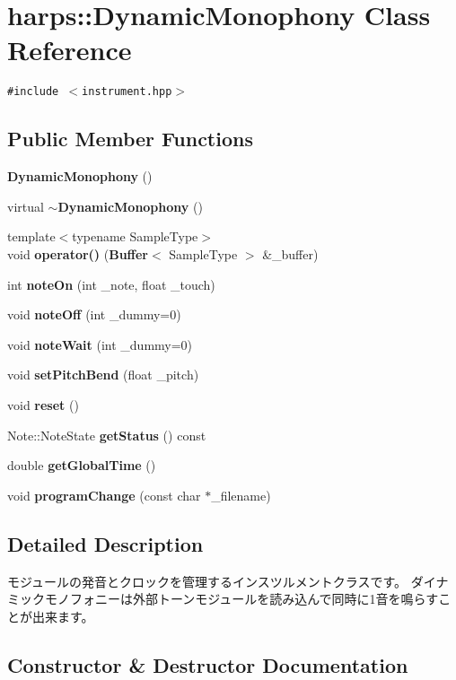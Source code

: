 \section{harps::DynamicMonophony Class Reference}
\label{classharps_1_1DynamicMonophony}
{\tt \#include $<$instrument.hpp$>$}

\subsection*{Public Member Functions}
\begin{CompactItemize}
\item 
{\bf DynamicMonophony} ()
\item 
virtual {\bf $\sim$DynamicMonophony} ()
\item 
{\footnotesize template$<$typename SampleType$>$ }\\void {\bf operator()} ({\bf Buffer}$<$ SampleType $>$ \&\_\-buffer)
\item 
int {\bf noteOn} (int \_\-note, float \_\-touch)
\item 
void {\bf noteOff} (int \_\-dummy=0)
\item 
void {\bf noteWait} (int \_\-dummy=0)
\item 
void {\bf setPitchBend} (float \_\-pitch)
\item 
void {\bf reset} ()
\item 
Note::NoteState {\bf getStatus} () const 
\item 
double {\bf getGlobalTime} ()
\item 
void {\bf programChange} (const char $\ast$\_\-filename)
\end{CompactItemize}


\subsection{Detailed Description}
モジュールの発音とクロックを管理するインスツルメントクラスです。 ダイナミックモノフォニーは外部トーンモジュールを読み込んで同時に1音を鳴らすことが出来ます。 

\subsection{Constructor \& Destructor Documentation}
